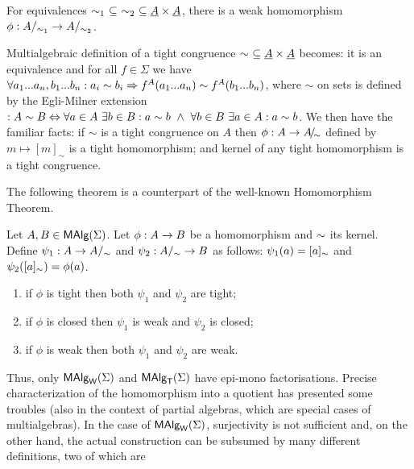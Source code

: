 \documentclass[10pt]{article}
\begin{document}
\begin{Fact}
\label{fa:subeq}
For equivalences %
$\sim_1\
\subseteq\ \sim_2\ \subseteq \underline {A}\times\underline {A}$, there is a weak homomorphism
$\phi:A/_{\sim_{1}}\rightarrow A/_{\sim_{2}}$.
\end{Fact}

\noindent
Multialgebraic definition of a tight congruence $\sim\ \subseteq \underline {A}\times\underline {A}$
becomes:
it is an equivalence and for all $f\in\Sigma$ we have $\forall
a_{1}...a_{n},b_{1}...b_{n}:a_i\sim  b_i \Rightarrow f^A(a_{1}...a_{n})\sim f^A(b_{1}...b_{n})$, where $\sim$ on sets
is defined by the Egli-Milner extension $:A\sim B\Iff \forall a\in A\ 
\exists b\in B:a\sim b\
\land\ \forall b\in B\ \exists a\in A:a\sim b$.  We then have the
familiar facts: if $\sim$ is a tight congruence on $A$ then
$\phi:A\rightarrow A\!{\textstyle /}\!_{\sim}$ defined by $m\mapsto [m]_\sim$ is a tight
homomorphism; and kernel of any tight homomorphism is a tight
congruence.

The following theorem is a counterpart of the well-known Homomorphism
Theorem.

\begin{Theorem}
\label{th:epimono}
Let $A,B \in \mbox{\rm\sf MAlg}(\Sigma)$.  Let $\phi: A \rightarrow B$ be a homomorphism and
$\sim$ its kernel. Define $\psi_1: A \rightarrow A/_\sim$ and $\psi_2:
A/_\sim \rightarrow B$ as follows: $\psi_1(a) = [a]_\sim$ and
$\psi_2([a]_\sim) = \phi(a)$.
\begin{enumerate}\MyLPar
\item{if $\phi$ is tight then both $\psi_1$ and $\psi_2$ are tight;}
\item{if $\phi$ is closed then $\psi_1$ is weak and $\psi_2$ is closed;}
\item{if $\phi$ is weak then both $\psi_1$ and $\psi_2$ are weak.}
\end{enumerate}
\end{Theorem}


\noindent
Thus, only $\mbox{\rm\sf MAlg}_{\sf W}(\Sigma)$ and $\mbox{\rm\sf MAlg}_{\sf T}(\Sigma)$ have epi-mono factorisations. 
Precise characterization of the homomorphism into a quotient has presented some
troubles (also in the context of partial algebras, which are special cases of 
multialgebras). In the case of $\mbox{\rm\sf MAlg}_{\sf W}(\Sigma)$, surjectivity is not sufficient and, on the
other hand, the actual construction can be subsumed by many different definitions,
two of which are
\end{document}
